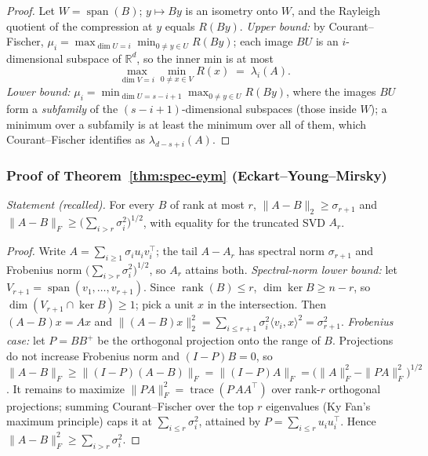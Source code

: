 \begin{proof}
Let $W = \operatorname{span}(B)$; $y \mapsto By$ is an isometry onto $W$,
and the Rayleigh quotient of the compression at $y$ equals $R(By)$.
\emph{Upper bound:} by Courant--Fischer, $\mu_i = \max_{\dim U = i}
\min_{0 \ne y \in U} R(By)$; each image $BU$ is an $i$-dimensional
subspace of $\mathbb{R}^d$, so the inner min is at most
\[
\max_{\dim V = i}\min_{0 \ne x \in V} R(x) \;=\; \lambda_i(A).
\]
\emph{Lower bound:} $\mu_i = \min_{\dim U = s-i+1} \max_{0 \ne y \in U}
R(By)$, where the images $BU$ form a \emph{subfamily} of the
$(s-i+1)$-dimensional subspaces (those inside $W$); a minimum over a
subfamily is at least the minimum over all of them, which Courant--Fischer
identifies as $\lambda_{d-s+i}(A)$.
\end{proof}

\subsubsection*{Proof of Theorem~\ref{thm:spec-eym} (Eckart--Young--Mirsky)}
{\itshape Statement (recalled).} For every $B$ of rank at most $r$,
$\|A - B\|_2 \ge \sigma_{r+1}$ and $\|A - B\|_F \ge
\bigl(\sum_{i > r}\sigma_i^2\bigr)^{1/2}$, with equality for the truncated
SVD $A_r$.\eop

\begin{proof}
Write $A = \sum_{i \ge 1} \sigma_i u_i v_i^{\top}$; the tail $A - A_r$ has
spectral norm $\sigma_{r+1}$ and Frobenius norm $\bigl(\sum_{i >
r}\sigma_i^2\bigr)^{1/2}$, so $A_r$ attains both. \emph{Spectral-norm lower
bound:} let $V_{r+1} = \operatorname{span}(v_1, \dots, v_{r+1})$. Since
$\operatorname{rank}(B) \le r$, $\dim\ker B \ge n - r$, so $\dim(V_{r+1}
\cap \ker B) \ge 1$; pick a unit $x$ in the intersection. Then $(A - B)x =
Ax$ and $\|(A-B)x\|_2^2 = \sum_{i \le r+1} \sigma_i^2\langle v_i,
x\rangle^2 = \sigma_{r+1}^2$. \emph{Frobenius case:} let $P = BB^{+}$ be
the orthogonal projection onto the range of $B$. Projections do not
increase Frobenius norm and $(I - P)B = 0$, so $\|A-B\|_F \ge
\|(I-P)(A-B)\|_F = \|(I-P)A\|_F = \bigl(\|A\|_F^2 - \|PA\|_F^2\bigr)^{1/2}$.
It remains to maximize $\|PA\|_F^2 = \operatorname{trace}(P\,AA^{\top})$
over rank-$r$ orthogonal projections; summing Courant--Fischer over the
top $r$ eigenvalues (Ky Fan's maximum principle) caps it at $\sum_{i \le
r} \sigma_i^2$, attained by $P = \sum_{i \le r} u_i u_i^{\top}$. Hence
$\|A - B\|_F^2 \ge \sum_{i > r} \sigma_i^2$.
\end{proof}


